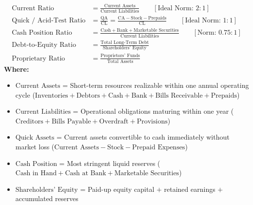 \newpage
\begin{formulabox}
\begin{align*}
    \text{Current Ratio} &= \frac{\text{Current Assets}}{\text{Current Liabilities}} \qquad [\text{Ideal Norm: } 2 : 1] \\[4pt]
    \text{Quick / Acid-Test Ratio} &= \frac{\text{QA}}{\text{CL}} = \frac{\text{CA} - \text{Stock} - \text{Prepaids}}{\text{CL}} \qquad [\text{Ideal Norm: } 1 : 1] \\[4pt]
    \text{Cash Position Ratio} &= \frac{\text{Cash} + \text{Bank} + \text{Marketable Securities}}{\text{Current Liabilities}} \qquad [\text{Norm: } 0.75 : 1] \\[4pt]
    \text{Debt-to-Equity Ratio} &= \frac{\text{Total Long-Term Debt}}{\text{Shareholders' Equity}} \\[4pt]
    \text{Proprietary Ratio} &= \frac{\text{Proprietors' Funds}}{\text{Total Assets}}
\end{align*}
\textbf{Where:}
\begin{itemize}[noitemsep, topsep=2pt]
    \item $\text{Current Assets}$ = Short-term resources realizable within one annual operating cycle ($\text{Inventories} + \text{Debtors} + \text{Cash} + \text{Bank} + \text{Bills Receivable} + \text{Prepaids}$)
    \item $\text{Current Liabilities}$ = Operational obligations maturing within one year ($\text{Creditors} + \text{Bills Payable} + \text{Overdraft} + \text{Provisions}$)
    \item $\text{Quick Assets}$ = Current assets convertible to cash immediately without market loss ($\text{Current Assets} - \text{Stock} - \text{Prepaid Expenses}$)
    \item $\text{Cash Position}$ = Most stringent liquid reserves ($\text{Cash in Hand} + \text{Cash at Bank} + \text{Marketable Securities}$)
    \item $\text{Shareholders' Equity}$ = Paid-up equity capital $+$ retained earnings $+$ accumulated reserves
\end{itemize}
\end{formulabox}

